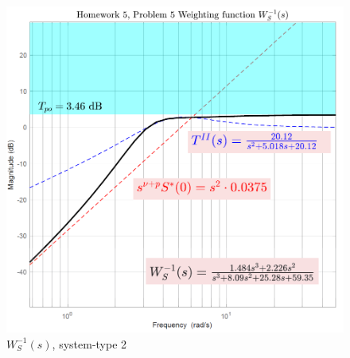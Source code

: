 \documentclass[a4paper, 12pt]{article}
\begin{document}
    \begin{figure}\label{fig: type2_1}
        \centering
        \includegraphics[scale=0.7]{img/Ws_type2_1.png}
        \caption{$W_S^{-1}(s)$, system-type 2}
    \end{figure}
\end{document}
